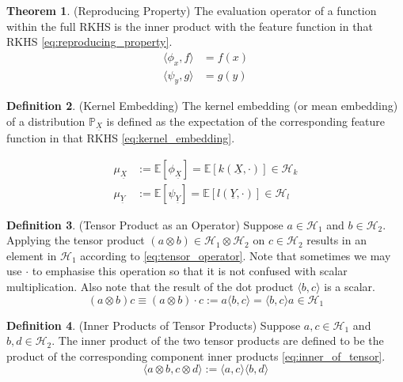 \documentclass[twoside]{article} \usepackage{aistats2017}
\theoremstyle{definition}
\newtheorem{theorem}{Theorem}[section]
\newtheorem{definition}[theorem]{Definition}
\newcommand{\rv}[1]{\underline{#1}}
\newcommand{\expect}[1]{{\mathbb{E}[#1]}}
\newcommand{\inner}[2]{{\langle #1, #2 \rangle}}
\newcommand{\Hk}{\mathcal{H}_{k}}
\newcommand{\Hl}{\mathcal{H}_{l}}
\newcommand{\muX}{\mu_{\rv{X}}}
\newcommand{\muY}{\mu_{\rv{Y}}}
\newcommand{\phiX}{\phi_{\rv{X}}}
\newcommand{\psiY}{\psi_{\rv{Y}}}
\begin{document}
	\begin{theorem} \label{thm:reproducing_property}
		(Reproducing Property)
		The evaluation operator of a function within the full RKHS is the inner product with the feature function in that RKHS \eqref{eq:reproducing_property}.
		\begin{equation}
		\begin{aligned}
			\inner{\phi_{x}}{f} &= f(x) \\
			\inner{\psi_{y}}{g} &= g(y)
		\label{eq:reproducing_property}
		\end{aligned}
		\end{equation}	
	\end{theorem}

	\begin{definition} \label{def:kernel_embedding}
		(Kernel Embedding)
		The kernel embedding (or mean embedding) of a distribution $\mathbb{P}_{\rv{X}}$ is defined as the expectation of the corresponding feature function in that RKHS \eqref{eq:kernel_embedding}.
		
		\begin{equation}
		\begin{aligned}
			\muX &:= \expect{\phiX} = \expect{k(\rv{X}, \cdot)} \in \Hk \\
			\muY &:= \expect{\psiY} = \expect{l(\rv{Y}, \cdot)} \in \Hl
		\label{eq:kernel_embedding}
		\end{aligned}
		\end{equation}	
	\end{definition}

	\begin{definition} \label{def:tensor_operator}
		(Tensor Product as an Operator)
		Suppose $a \in \mathcal{H}_{1}$ and $b \in \mathcal{H}_{2}$. Applying the tensor product $(a \otimes b) \in \mathcal{H}_{1} \otimes \mathcal{H}_{2}$ on $c \in \mathcal{H}_{2}$ results in an element in $\mathcal{H}_{1}$ according to \eqref{eq:tensor_operator}. Note that sometimes we may use $\cdot$ to emphasise this operation so that it is not confused with scalar multiplication. Also note that the result of the dot product $\langle b, c \rangle$ is a scalar.
		\begin{equation}
			(a \otimes b) c \equiv (a \otimes b) \cdot c := a \langle b, c \rangle = \langle b, c \rangle a \in \mathcal{H}_{1}
		\label{eq:tensor_operator}
		\end{equation}
	\end{definition}
	
	\begin{definition} \label{def:inner_of_tensor}
		(Inner Products of Tensor Products)
		Suppose $a, c \in \mathcal{H}_{1}$ and $b, d \in \mathcal{H}_{2}$. The inner product of the two tensor products are defined to be the product of the corresponding component inner products \eqref{eq:inner_of_tensor}.
		\begin{equation}
			\inner{a \otimes b}{c \otimes d} := \inner{a}{c} \inner{b}{d}
		\label{eq:inner_of_tensor}
		\end{equation}
	\end{definition}
	
\end{document}
